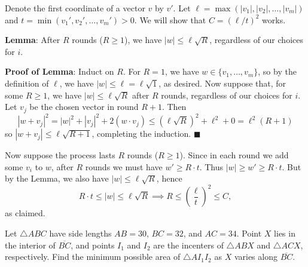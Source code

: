 \documentclass[11pt]{article}
\theoremstyle{definition}
\begin{document}
\begin{solution}[name={Solution by Michael Tang}]
	Denote the first coordinate of a vector $v$ by $v'$. Let $\ell = \max(|v_1|, |v_2|, \ldots, |v_m|)$ and $t = \min(v_1', v_2', \ldots, v_m') > 0$. We will show that $C = (\ell / t)^2$ works.	
	
	\textbf{Lemma}: After $R$ rounds ($R \ge 1$), we have $|w| \le \ell \sqrt{R}$, regardless of our choices for $i$.
	
	\textbf{Proof of Lemma}: Induct on $R$. For $R = 1$, we have $w \in \{v_1, \ldots, v_m\}$, so by the definition of $\ell$, we have $|w| \le \ell = \ell\sqrt{1}$, as desired. Now suppose that, for some $R \ge 1$, we have $|w| \le \ell\sqrt{R}$ after $R$ rounds, regardless of our choices for $i$. Let $v_j$ be the chosen vector in round $R+1$. Then\[|w + v_j|^2 = |w|^2 + |v_j|^2 + 2(w \cdot v_j) \le (\ell \sqrt{R})^2 + \ell^2 + 0 = \ell^2(R+1)\]so $|w + v_j| \le \ell \sqrt{R+1}$, completing the induction. $\blacksquare$
	
	Now suppose the process lasts $R$ rounds ($R \ge 1$). Since in each round we add some $v_i$ to $w$, after $R$ rounds we must have $w' \ge R \cdot t$. Thus $|w| \ge w' \ge R \cdot t$. But by the Lemma, we also have $|w| \le \ell \sqrt{R}$, hence\[R \cdot t \le |w| \le \ell \sqrt{R} \implies R \le \left(\frac{\ell}{t}\right)^2 \le C,\]as claimed.
\end{solution}








\begin{question}[name={2018 AIME I, \href{https://artofproblemsolving.com/community/c4p9995418}{Problem 13}}]
	Let \(\triangle ABC\) have side lengths \(AB=30\), \(BC=32\), and \(AC=34\). Point \(X\) lies in the interior of \(\overline{BC}\), and points \(I_1\) and \(I_2\) are the incenters of \(\triangle ABX\) and \(\triangle ACX\), respectively. Find the minimum possible area of \(\triangle AI_1I_2\) as \( X\) varies along \(\overline{BC}\).
\end{question}
\end{document}
